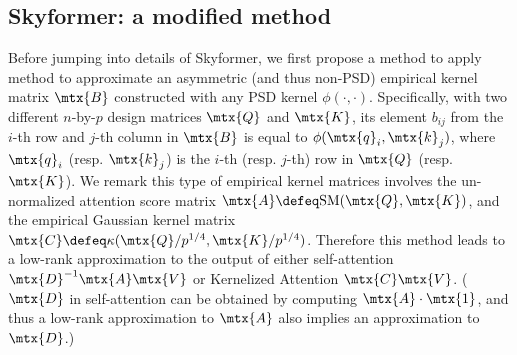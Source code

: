 \subsection{Skyformer: a modified \nystrom method}
\label{sec:nystrom}


Before jumping into details of Skyformer, 
we first propose a method to apply \nystrom method to approximate an asymmetric (and thus non-PSD) empirical kernel matrix $\mtx{B}$ constructed with any PSD kernel $\phi(\cdot, \cdot)$.
Specifically, with two different $n$-by-$p$ design matrices $\mtx{Q}$ and $\mtx{K}$,
its element $b_{ij}$ from the $i$-th row and $j$-th column in $\mtx{B}$ is equal to $\phi(\mtx{q}_i, \mtx{k}_j)$,
where $\mtx{q}_i$ (resp. $\mtx{k}_j$) is the $i$-th (resp. $j$-th) row in $\mtx{Q}$ (resp. $\mtx{K}$).
We remark this type of empirical kernel matrices involves the un-normalized attention score matrix $\mtx{A} \defeq \text{SM}(\mtx{Q}, \mtx{K})$,
and the empirical Gaussian kernel matrix $\mtx{C} \defeq \kappa(\mtx{Q} / p^{1/4}, \mtx{K} / p^{1/4})$.
Therefore this method leads to a low-rank approximation to the output of either self-attention $\mtx{D}^{-1} \mtx{A} \mtx{V}$ or Kernelized Attention $\mtx{C} \mtx{V}$.
($\mtx{D}$ in self-attention can be obtained by computing $\mtx{A} \cdot \mtx{1}$, and thus a low-rank approximation to $\mtx{A}$ also implies an approximation to $\mtx{D}$.)


